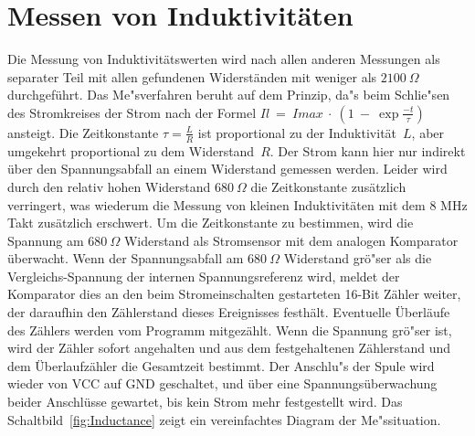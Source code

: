 \section{Messen von Induktivit\"aten}
Die Messung von Induktivit\"atswerten wird nach allen anderen Messungen als separater Teil mit allen
gefundenen Widerst\"anden mit weniger als \(2100~\Omega\) durchgef\"uhrt.
Das Me"sverfahren beruht auf dem Prinzip, da"s beim Schlie"sen des Stromkreises der Strom nach
der Formel \(Il~=~Imax~\cdot~(1~-~\exp{\frac{-t}{\tau}})\) ansteigt.
Die Zeitkonstante \(\tau = \frac{L}{R}\) ist proportional zu der Induktivit\"at~\(L\), aber umgekehrt
proportional zu dem Widerstand~\(R\). 
Der Strom kann hier nur indirekt \"uber den Spannungsabfall an einem Widerstand
gemessen werden.
Leider wird durch den relativ hohen Widerstand \(680~\Omega\) die Zeitkonstante zus\"atzlich verringert, was
wiederum die Messung von kleinen Induktivit\"aten mit dem 8 MHz Takt zus\"atzlich erschwert.
Um die Zeitkonstante zu bestimmen, wird die Spannung am \(680~\Omega\) Widerstand als Stromsensor
mit dem analogen Komparator \"uberwacht. Wenn der Spannungsabfall am \(680~\Omega\) Widerstand gr\"o"ser als
die Vergleichs-Spannung der internen Spannungsreferenz wird, meldet der Komparator dies an den beim
Stromeinschalten gestarteten 16-Bit Z\"ahler weiter, der daraufhin den Z\"ahlerstand dieses
Ereignisses festh\"alt. Eventuelle \"Uberl\"aufe des Z\"ahlers werden vom Programm mitgez\"ahlt. 
Wenn die Spannung gr\"o"ser ist, wird der Z\"ahler sofort angehalten und aus dem festgehaltenen Z\"ahlerstand und
dem \"Uberlaufz\"ahler die Gesamtzeit bestimmt.
Der Anschlu"s der Spule wird wieder von VCC auf GND geschaltet, und \"uber eine Spannungs\"uberwachung beider
Anschl\"usse gewartet, bis kein Strom mehr festgestellt wird.
Das Schaltbild~\ref{fig:Inductance} zeigt ein vereinfachtes Diagram der Me"ssituation.


